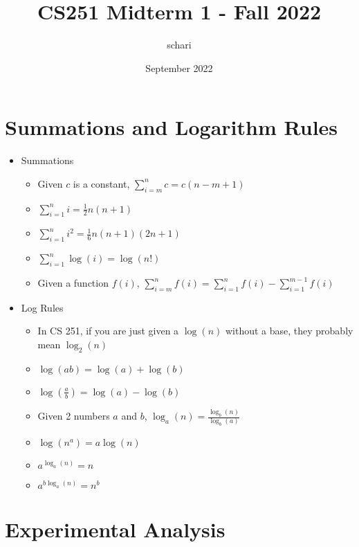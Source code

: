 \documentclass{article}
\title{CS251 Midterm 1 - Fall 2022}
\author{schari}
\date{September 2022}
\begin{document}
\maketitle

\section{Summations and Logarithm Rules}
\begin{itemize}
    \item Summations
        \begin{itemize}
            \item Given $c$ is a constant, $\sum_{i = m}^{n} c = c(n - m + 1)$
            \item $\sum_{i = 1}^{n} i = \frac{1}{2}n(n + 1)$
            \item $\sum_{i = 1}^{n} i^2 = \frac{1}{6}n(n + 1)(2n + 1)$
            \item $\sum_{i = 1}^{n} \log(i) = \log(n!)$
            \item Given a function $f(i)$, $\sum_{i = m}^{n} f(i) = \sum_{i = 1}^{n} f(i) - \sum_{i = 1}^{m - 1} f(i)$
        \end{itemize}
    \item Log Rules
        \begin{itemize}
            \item In CS 251, if you are just given a $\log(n)$ without a base, they probably mean $\log_2(n)$
            \item $\log(ab) = \log(a) + \log(b)$
            \item $\log(\frac{a}{b}) = \log(a) - \log(b)$
            \item Given 2 numbers $a$ and $b$, $\log_a(n) = \frac{\log_b(n)}{\log_b(a)}$
            \item $\log(n^a) = a \log(n)$
            \item $a^{\log_a(n)} = n$
            \item $a^{b \log_a(n)} = n^b$
        \end{itemize}
\end{itemize}

\section{Experimental Analysis}
\end{document}
